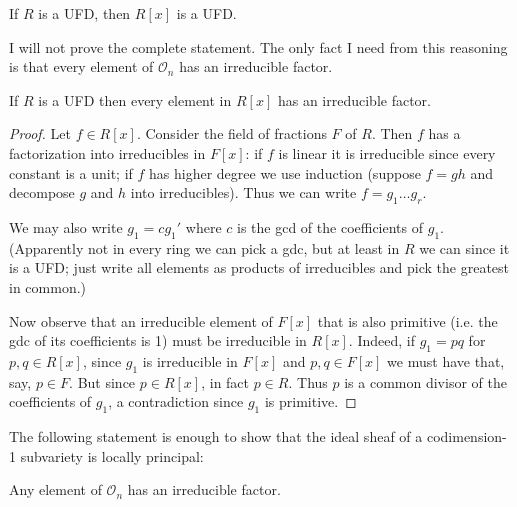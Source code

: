 \begin{lemma}
\label{lemma-Gauss-UFD}
If $R$ is a UFD, then $R[x]$ is a UFD.
\end{lemma}

I will not prove the complete statement. The only fact I need from this
reasoning is that every element of $\mathcal{O}_n$ has an irreducible factor.

\begin{lemma}
\label{lemma-polynomials-over-UFD-have-irreducible-factor}
If $R$ is a UFD then every element in $R[x]$ has an irreducible factor.
\end{lemma}

\begin{proof}
Let $f\in R[x]$. Consider the field of fractions $F$ of $R$. Then $f$ has a
factorization into irreducibles in $F[x]$: if $f$
is linear it is irreducible since every constant is a unit; if $f$ has higher
degree we use induction (suppose $f=gh$ and decompose $g$ and $h$ into
irreducibles). Thus we can write $f=g_1\ldots g_r$.

We may also write $g_1=cg_1'$ where $c$ is the gcd of the coefficients of $g_1$.
(Apparently not in every ring we can pick a gdc, but at least in $R$ we can
since it is a UFD; just write all elements as products of irreducibles and pick
the greatest in common.)

Now observe that an irreducible element of $F[x]$ that is also primitive (i.e.
the gdc of its coefficients is 1) must be irreducible in $R[x]$. Indeed, if
$g_1=pq$ for $p,q \in R[x]$, since $g_1$ is irreducible in $F[x]$ and  $p,q \in
F[x]$ we must have that, say, $p \in F$. But since $p \in R[x]$, in fact $p\in
R$. Thus $p$ is a common divisor of the coefficients of $g_1$, a contradiction
since $g_1$ is primitive.
\end{proof}

The following statement is enough to show that the ideal sheaf of a
codimension-1 subvariety is locally principal:

\begin{lemma}
\label{lemma-}
Any element of $\mathcal{O}_n$ has an irreducible factor.
\end{lemma}

